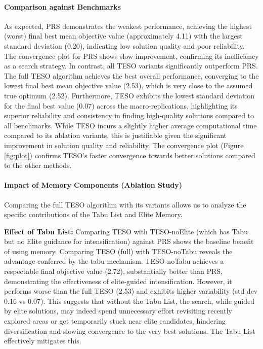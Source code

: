 \documentclass{article}
\begin{document}
\paragraph{Comparison against Benchmarks}
As expected, PRS demonstrates the weakest performance, achieving the highest (worst) final best mean objective value (approximately 4.11) with the largest standard deviation (0.20), indicating low solution quality and poor reliability. The convergence plot for PRS shows slow improvement, confirming its inefficiency as a search strategy. In contrast, all TESO variants significantly outperform PRS. The full TESO algorithm achieves the best overall performance, converging to the lowest final best mean objective value (2.53), which is very close to the assumed true optimum (2.52). Furthermore, TESO exhibits the lowest standard deviation for the final best value (0.07) across the macro-replications, highlighting its superior reliability and consistency in finding high-quality solutions compared to all benchmarks. While TESO incurs a slightly higher average computational time compared to its ablation variants, this is justifiable given the significant improvement in solution quality and reliability. The convergence plot (Figure \ref{fig:plot}) confirms TESO's faster convergence towards better solutions compared to the other methods.

\paragraph{Impact of Memory Components (Ablation Study)}
Comparing the full TESO algorithm with its variants allows us to analyze the specific contributions of the Tabu List and Elite Memory.

\noindent\textbf{Effect of Tabu List:} Comparing TESO with TESO-noElite (which has Tabu but no Elite guidance for intensification) against PRS shows the baseline benefit of using memory. Comparing TESO (full) with TESO-noTabu reveals the advantage conferred by the tabu mechanism. TESO-noTabu achieves a respectable final objective value (2.72), substantially better than PRS, demonstrating the effectiveness of elite-guided intensification. However, it performs worse than the full TESO (2.53) and exhibits higher variability (std dev 0.16 vs 0.07). This suggests that without the Tabu List, the search, while guided by elite solutions, may indeed spend unnecessary effort revisiting recently explored areas or get temporarily stuck near elite candidates, hindering diversification and slowing convergence to the very best solutions. The Tabu List effectively mitigates this.
\end{document}
